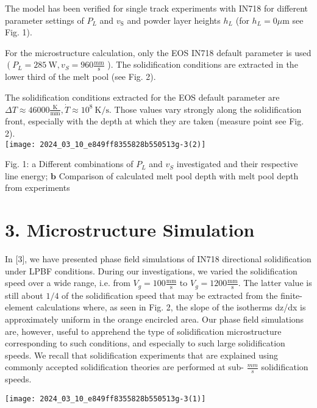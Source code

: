\documentclass[10pt]{article}
\begin{document}
The model has been verified for single track experiments with IN718 for different parameter settings of $P_{L}$ and $v_{\mathrm{S}}$ and powder layer heights $h_{L}$ (for $h_{L}=0 \mu \mathrm{m}$ see Fig. 1).

For the microstructure calculation, only the EOS IN718 default parameter is used $\left(P_{L}=285 \mathrm{~W}, v_{S}=960 \frac{\mathrm{mm}}{\mathrm{s}}\right.$ ). The solidification conditions are extracted in the lower third of the melt pool (see Fig. 2).

The solidification conditions extracted for the EOS default parameter are $\Delta T \approx 46000 \frac{\mathrm{K}}{\mathrm{mm}}, \dot{T} \approx 10^{8} \mathrm{~K} / \mathrm{s}$. Those values vary strongly along the solidification front, especially with the depth at which they are taken (measure point see Fig. 2).\\
\texttt{[image: 2024\_03\_10\_e849ff8355828b550513g-3(2)]}

Fig. 1: a Different combinations of $P_{L}$ and $v_{S}$ investigated and their respective line energy; $\mathbf{b}$ Comparison of calculated melt pool depth with melt pool depth from experiments

\section*{3. Microstructure Simulation}
In [3], we have presented phase field simulations of IN718 directional solidification under LPBF conditions. During our investigations, we varied the solidification speed over a wide range, i.e. from $V_{g}=100 \frac{\mathrm{mm}}{\mathrm{s}}$ to $V_{g}=1200 \frac{\mathrm{mm}}{\mathrm{s}}$. The latter value is still about $1 / 4$ of the solidification speed that may be extracted from the finite-element calculations where, as seen in Fig. 2, the slope of the isotherms dz/dx is approximately uniform in the orange encircled area. Our phase field simulations are, however, useful to apprehend the type of solidification microstructure corresponding to such conditions, and especially to such large solidification speeds. We recall that solidification experiments that are explained using commonly accepted solidification theories are performed at sub- $\frac{m m}{s}$ solidification speeds.

\begin{center}
\texttt{[image: 2024\_03\_10\_e849ff8355828b550513g-3(1)]}
\end{center}
\end{document}
